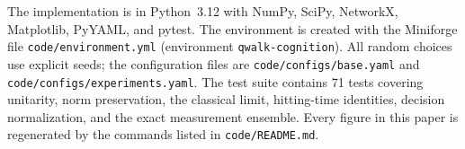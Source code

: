 The implementation is in Python~3.12 with NumPy, SciPy, NetworkX, Matplotlib,
PyYAML, and pytest. The environment is created with the Miniforge file
\texttt{code/environment.yml} (environment \texttt{qwalk-cognition}). All
random choices use explicit seeds; the configuration files are
\texttt{code/configs/base.yaml} and \texttt{code/configs/experiments.yaml}. The
test suite contains 71 tests covering unitarity, norm preservation, the
classical limit, hitting-time identities, decision normalization, and the
exact measurement ensemble. Every figure in this paper is regenerated by the
commands listed in \texttt{code/README.md}.

\FloatBarrier

